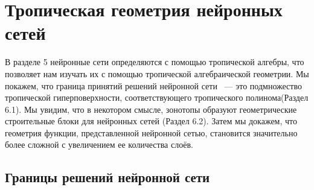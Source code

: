 \documentclass[russian]{lecture-notes}
\begin{document}
	
	
	
	
	\section{Тропическая геометрия нейронных сетей}
	
	В разделе 5 нейронные сети определяются с помощью тропической алгебры, что позволяет нам изучать их с помощью тропической алгебраической геометрии. Мы покажем, что граница принятий решений нейронной сети ~--- это подмножество тропической гиперповерхности, соответствующего тропического полинома(Раздел 6.1). Мы увидим, что в некотором смысле, зонотопы образуют геометрические строительные блоки для нейронных сетей (Раздел 6.2). Затем мы докажем, что геометрия функции, представленной нейронной сетью, становится значительно более сложной с увеличением ее количества слоёв.
	\subsection{Границы решений нейронной сети}
	
\end{document}
